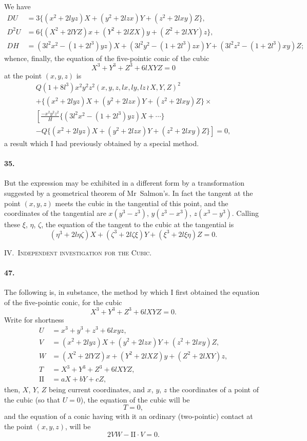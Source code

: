 \documentclass[11pt,a4paper]{book}
\begin{document}
We  have
\begin{align*}
DU &= 3\{(x^2 + 2lyz)X + (y^2 + 2lzx)Y + (z^2 + 2lxy)Z\}, \\
D^2 U &= 6\{(X^2 + 2lYZ)x + (Y^2 + 2lZX)y + (Z^2 + 2lXY)z\}, \\
DH &= (3l^2 x^2 - (1 + 2l^3)yz)X + (3l^2 y^2 - (1 + 2l^3)zx)Y + (3l^2 z^2 - (1 + 2l^3)xy)Z;
\end{align*}
whence,  finally,  the  equation  of  the  five-pointic  conic  of  the  cubic
\[
X^3 + Y^3 + Z^3 + 6lXYZ = 0
\]
at  the  point  $(x, y, z)$  is
\begin{multline*}
Q(1 + 8l^3) x^2 y^2 z^2 (x, y, z, lx, ly, lz \,\!\!\wr\, X, Y, Z)^2 \\
+ \{(x^2 + 2lyz)X + (y^2 + 2lzx)Y + (z^2 + 2lxy)Z\} \times \\
\left[\frac{-x^2 y^2 z^2}{H} \{(3l^2 x^2 - (1 + 2l^3)yz)X + \cdots\} \right. \\
\left. - Q\{(x^2 + 2lyz)X + (y^2 + 2lzx)Y + (z^2 + 2lxy)Z\}\right] = 0,
\end{multline*}
a  result  which  I  had  previously  obtained  by  a  special  method.

\paragraph{35.}
But  the  expression  may  be  exhibited  in  a  different  form  by  a  transformation
suggested  by  a  geometrical  theorem  of  Mr~Salmon's.  In  fact  the  tangent  at  the  point
$(x, y, z)$  meets  the  cubic  in  the  tangential  of  this  point,  and  the  coordinates  of  the
tangential  are  $x(y^3 - z^3)$,  $y(z^3 - x^3)$,  $z(x^3 - y^3)$.  Calling  these  $\xi$,  $\eta$,  $\zeta$,  the  equation  of
the  tangent  to  the  cubic  at  the  tangential  is
\[
(\eta^3 + 2l\eta\zeta)X + (\zeta^3 + 2l\zeta\xi)Y + (\xi^3 + 2l\xi\eta)Z = 0.
\]

\newpage
\noindent\textsc{IV.~Independent investigation for the Cubic.}

\medskip

\paragraph{47.}
The  following  is,  in  substance,  the  method  by  which  I  first  obtained  the
equation  of  the  five-pointic  conic,  for  the  cubic
\[
X^3 + Y^3 + Z^3 + 6lXYZ = 0.
\]
Write  for  shortness
\begin{align*}
U &= x^3 + y^3 + z^3 + 6lxyz, \\
V &= (x^2 + 2lyz)X + (y^2 + 2lzx)Y + (z^2 + 2lxy)Z, \\
W &= (X^2 + 2lYZ)x + (Y^2 + 2lXZ)y + (Z^2 + 2lXY)z, \\
T &= X^3 + Y^3 + Z^3 + 6lXYZ, \\
\mathrm{II} &= aX + bY + cZ,
\end{align*}
then,  $X$,  $Y$,  $Z$  being  current  coordinates,  and  $x$,  $y$,  $z$  the  coordinates  of  a  point  of
the  cubic  (so  that  $U = 0$),  the  equation  of  the  cubic  will  be
\[
T = 0,
\]
and  the  equation  of  a  conic  having  with  it  an  ordinary  (two-pointic)  contact  at  the
point  $(x, y, z)$,  will  be
\[
2VW - \mathrm{II} \cdot V = 0.
\]
\end{document}
